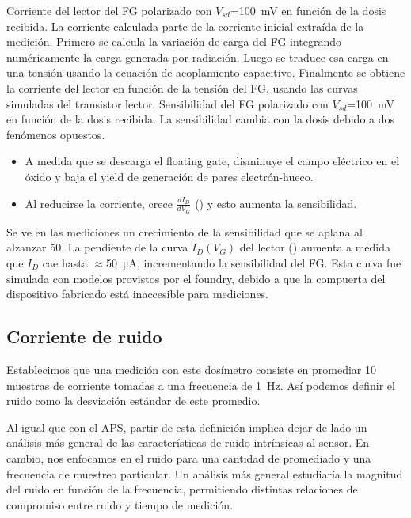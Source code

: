 {Corriente del lector del FG polarizado con
    $V_{sd}$=\SI{100}{\milli\volt} en función de la dosis recibida.
La corriente calculada parte de la corriente inicial extraída de la
medición.
Primero se calcula la variación de carga del FG 
integrando numéricamente la carga generada por radiación.
Luego se traduce esa carga en una tensión
usando la ecuación de acoplamiento capacitivo.
Finalmente se obtiene la corriente del lector
en función de la tensión del FG,
usando las curvas simuladas del transistor lector.}
{Sensibilidad del FG polarizado con
    $V_{sd}$=\SI{100}{\milli\volt} en función de la dosis recibida.
}
La sensibilidad cambia con la dosis debido a dos fenómenos opuestos.
\begin{itemize}
    \item A medida que se descarga el floating gate, disminuye el 
        campo eléctrico en el óxido y baja el yield de generación de pares 
        electrón-hueco.
    \item Al reducirse la corriente, crece $\frac{dI_D}{dV_G}$ 
        () y esto aumenta la sensibilidad.
\end{itemize}
Se ve en las mediciones un crecimiento de la sensibilidad que se aplana al
alzanzar \SI{50}{\Gray}.
{La pendiente de la curva $I_D(V_G)$ del lector () 
aumenta a medida que $I_D$ cae hasta $\approx$\SI{50}{\micro\ampere}, 
incrementando la sensibilidad del FG.
Esta curva fue simulada con modelos provistos por el foundry,
debido a que la compuerta del dispositivo fabricado está inaccesible para
mediciones.}
\subsection{Corriente de ruido}
Establecimos que una medición con este dosímetro 
consiste en promediar 10 muestras de corriente
tomadas a una frecuencia de \SI{1}{\hertz}.
Así podemos definir el ruido como la desviación estándar de este promedio.

Al igual que con el APS, partir de esta definición
implica dejar de lado un análisis más general de las características de ruido
intrínsicas al sensor.
En cambio, nos enfocamos en el ruido para una cantidad de promediado
y una frecuencia de muestreo particular.
Un análisis más general estudiaría 
la magnitud del ruido en función de la frecuencia,
permitiendo distintas relaciones de compromiso 
entre ruido y tiempo de medición.


